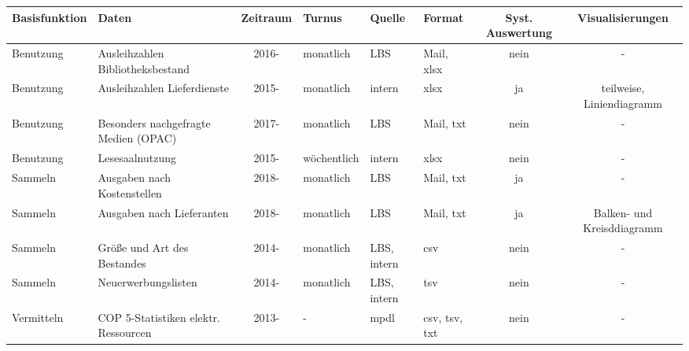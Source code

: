 \begingroup
\setlength{\tabcolsep}{4pt} %
\renewcommand{\arraystretch}{1.5}
\begin{table}[h]
    \centering
    \begin{adjustbox}{max width=\textwidth}
    \Huge
    \begin{tabular}{llclllcc}
       \toprule
       \textbf{Basisfunktion}               &\textbf{Daten}                                 &\textbf{Zeitraum} &\textbf{Turnus}    &\textbf{Quelle}  &\textbf{Format}          &\textbf{Syst. Auswertung} & \textbf{Visualisierungen}\\
       \midrule     
            Benutzung                       & Ausleihzahlen Bibliotheksbestand              & 2016-             & monatlich         & LBS          & Mail, xlsx                & nein  & -\\
            Benutzung                       & Ausleihzahlen Lieferdienste                   & 2015-             & monatlich         & intern       & xlsx                      & ja    & teilweise, Liniendiagramm\\ 
            Benutzung                       & Besonders nachgefragte Medien (OPAC)          & 2017-             & monatlich         & LBS          & Mail, txt                 & nein  & -\\ 
            Benutzung                       & Lesesaalnutzung                               & 2015-             & wöchentlich       & intern       & xlsx                      & nein  & -\\ 
            Sammeln                         & Ausgaben nach Kostenstellen                   & 2018-             & monatlich         & LBS          & Mail, txt                 & ja    & -\\ 
            Sammeln                         & Ausgaben nach Lieferanten                     & 2018-             & monatlich         & LBS          & Mail, txt                 & ja    & Balken- und Kreisddiagramm\\ 
            Sammeln                         & Größe und Art des Bestandes                   & 2014-             & monatlich         & LBS, intern  & csv                       & nein  & -\\ 
            Sammeln                         & Neuerwerbungslisten                           & 2014-             & monatlich         & LBS, intern  & tsv                       & nein  & -\\ 
            Vermitteln                      & \acrshort{COP 5}-Statistiken elektr. Ressourcen& 2013-             & -                 & mpdl         & csv, tsv, txt             & nein  & -\\ 


\end{tabular}
\end{adjustbox}
\end{table}
